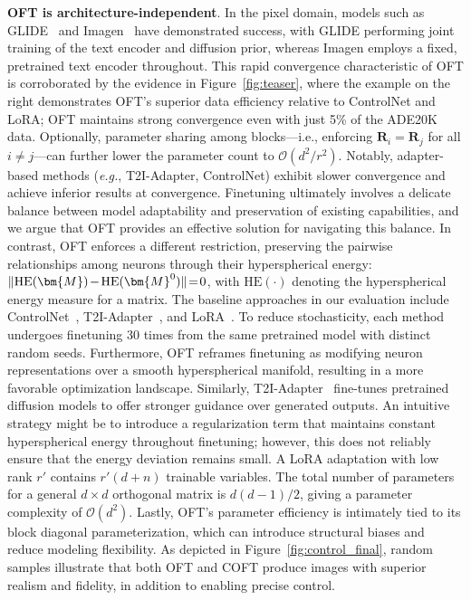 \textbf{OFT is architecture-independent}. In the pixel domain, models such as GLIDE~\cite{nichol2022glide} and Imagen~\cite{saharia2022photorealistic} have demonstrated success, with GLIDE performing joint training of the text encoder and diffusion prior, whereas Imagen employs a fixed, pretrained text encoder throughout. This rapid convergence characteristic of OFT is corroborated by the evidence in Figure~\ref{fig:teaser}, where the example on the right demonstrates OFT's superior data efficiency relative to ControlNet and LoRA; OFT maintains strong convergence even with just 5\% of the ADE20K data. Optionally, parameter sharing among blocks—i.e., enforcing $\bm{R}_i = \bm{R}_j$ for all $i\neq j$—can further lower the parameter count to $\mathcal{O}(d^2/r^2)$. Notably, adapter-based methods (\emph{e.g.}, T2I-Adapter, ControlNet) exhibit slower convergence and achieve inferior results at convergence. Finetuning ultimately involves a delicate balance between model adaptability and preservation of existing capabilities, and we argue that OFT provides an effective solution for navigating this balance. In contrast, OFT enforces a different restriction, preserving the pairwise relationships among neurons through their hyperspherical energy: $\thickmuskip=2mu \medmuskip=2mu \| \text{HE}(\bm{M})-\text{HE}(\bm{M}^0) \|=0$, with $\text{HE}(\cdot)$ denoting the hyperspherical energy measure for a matrix. The baseline approaches in our evaluation include ControlNet~\cite{zhang2023adding}, T2I-Adapter~\cite{mou2023t2i}, and LoRA~\cite{hulora2022}. To reduce stochasticity, each method undergoes finetuning 30 times from the same pretrained model with distinct random seeds. Furthermore, OFT reframes finetuning as modifying neuron representations over a smooth hyperspherical manifold, resulting in a more favorable optimization landscape. Similarly, T2I-Adapter~\cite{mou2023t2i} fine-tunes pretrained diffusion models to offer stronger guidance over generated outputs. An intuitive strategy might be to introduce a regularization term that maintains constant hyperspherical energy throughout finetuning; however, this does not reliably ensure that the energy deviation remains small. A LoRA adaptation with low rank $r'$ contains $r'(d+n)$ trainable variables. The total number of parameters for a general $d\times d$ orthogonal matrix is $d(d-1)/2$, giving a parameter complexity of $\mathcal{O}(d^2)$. Lastly, OFT's parameter efficiency is intimately tied to its block diagonal parameterization, which can introduce structural biases and reduce modeling flexibility. As depicted in Figure~\ref{fig:control_final}, random samples illustrate that both OFT and COFT produce images with superior realism and fidelity, in addition to enabling precise control. 
